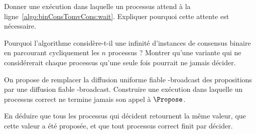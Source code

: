 \begin{exercice}
\begin{questions}
  \item Donner une exécution dans laquelle un processus attend à la ligne~\ref{algo:binConsTomvCons:wait}.
    Expliquer pourquoi cette attente est nécessaire.

  \item Pourquoi l'algorithme considère-t-il une infinité d'instances de consensus
    binaire en parcourant cycliquement les $n$ processus ?
    Montrer qu'une variante qui ne considérerait chaque processus qu'une seule
    fois pourrait ne jamais décider.

  \item On propose de remplacer la diffusion uniforme fiable \URB-broadcast des
    propositions par une diffusion fiable \RB-broadcast.
    Construire une exécution dans laquelle un processus correct ne termine
    jamais son appel à $\Propose$.
    
  \item En déduire que tous les processus qui décident retournent la même valeur,
    que cette valeur a été proposée, et que tout processus correct finit par
    décider.

  \end{questions}
  
\end{exercice}

\endgroup
\endinput
